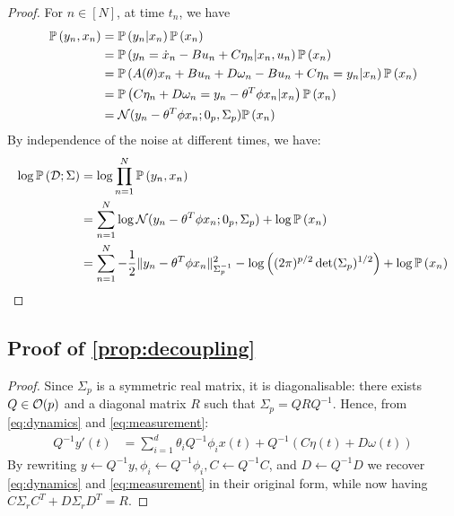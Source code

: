 \documentclass{article}
\begin{document}
\begin{proof}
For $n\in[N]$, at time $t_n$, we have
\begin{align*}
    \mathbb{P}\left(y_n, x_n\right) 
    &= \mathbb{P}\left(y_n|x_n\right)\mathbb{P}\left(x_n\right)\\
    &= \mathbb{P}\left(y_n = \dot{x}_n - Bu_n +C\eta_n|x_n,u_n\right)\mathbb{P}\left(x_n\right)\\
    &= \mathbb{P}\left(A(\theta)x_n + B u_n + D \omega_n - Bu_n +C\eta_n = y_n|x_n\right)\mathbb{P}\left(x_n\right)\\
    &= \mathbb{P}\left(C\eta_n + D \omega_n = y_n- \theta^T \phi x_n |x_n\right)\mathbb{P}\left(x_n\right)\\
    &= \mathcal{N}(y_n - \theta^T \phi x_n; 0_p,\Sigma_p)\mathbb{P}\left(x_n\right)
\end{align*}
By independence of the noise at different times, we have:
\begin{align*}
    \log\mathbb{P}\left(\mathcal{D};\Sigma\right) &= \log\prod_{n=1}^N\mathbb{P}\left(y_n, x_n\right)\\
    &= \sum_{n=1}^N\log \mathcal{N}(y_n- \theta^T \phi x_n;0_p,\Sigma_p) + \log\mathbb{P}\left(x_n\right)\\
    &= \sum_{n=1}^N -\frac{1}{2} \|y_n -\theta^T\phi x_n\|_{\Sigma_p^{-1}}^2 - \log\left((2\pi)^{p/2} \det(\Sigma_p)^{1/2}\right) + \log\mathbb{P}\left(x_n\right)
\end{align*}
\end{proof}

\subsection{Proof of \autoref{prop:decoupling}}

\begin{proof}
Since $\Sigma_p$ is a symmetric real matrix, it is diagonalisable: there exists $Q\in\mathcal{O}(p)$ and a diagonal matrix $R$ such that $\Sigma_p = QRQ^{-1}$. Hence, from \eqref{eq:dynamics} and \eqref{eq:measurement}:
\begin{align*}
    Q^{-1}y'(t) &= \sum_{i=1}^d \theta_i Q^{-1}\phi_i x(t) + Q^{-1}(C\eta(t) + D\omega(t))
\end{align*}
By rewriting $y \leftarrow Q^{-1}y, \phi_i\leftarrow Q^{-1}\phi_i, C\leftarrow Q^{-1}C$, and $D\leftarrow Q^{-1}D$ we recover \eqref{eq:dynamics} and \eqref{eq:measurement} in their original form, while now having $C\Sigma_rC^T + D\Sigma_rD^T = R$.
\end{proof}
\end{document}
